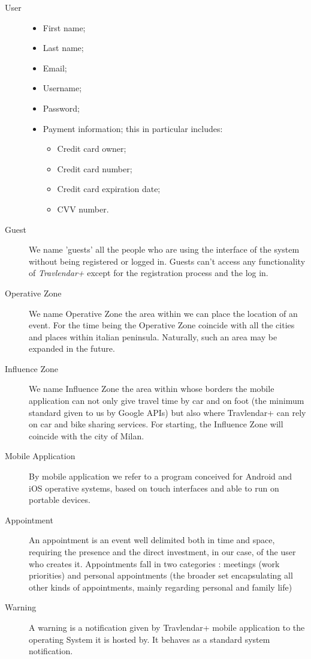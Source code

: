 \begin{description}
				\item[User] 
				\begin{itemize}
					\item First name;
					\item Last name; 
					\item Email;
					\item Username;
					\item Password;
					\item Payment information; this in particular includes:
						\begin{itemize}
							\item Credit card owner;
							\item Credit card number;
							\item Credit card expiration date;
							\item CVV number.
						\end{itemize}
				\end{itemize}
				
				\item[Guest] We name 'guests' all the people who are using the interface of the system without being registered or logged in. Guests can't access any functionality of \textit{Travlendar+} except for the registration process and the log in. 
				\item[Operative Zone] We name Operative Zone the area within we can place the location of an event. For the time being the Operative Zone coincide with all the cities and places within italian peninsula. Naturally, such an area may be expanded in the future.
				\item[Influence Zone] We name Influence Zone the area within whose borders the mobile application can not only give travel time by car and on foot (the minimum standard given to us by Google APIs) but also where Travlendar+ can rely on car and bike sharing services. For starting, the Influence Zone will coincide with the city of Milan.
				\item[Mobile Application] By mobile application we refer to a program conceived for Android and iOS operative systems, based on touch interfaces and able to run on portable devices.
				\item[Appointment] An appointment is an event well delimited both in time and space, requiring the presence and the direct investment, in our case, of the user who creates it. Appointments fall in two categories : meetings (work priorities) and personal appointments (the broader set encapsulating all other kinds of appointments, mainly regarding personal and family life)
				\item[Warning] A warning is a notification given by Travlendar+ mobile application to the operating System it is hosted by. It behaves as a standard system notification.
\end{description}
